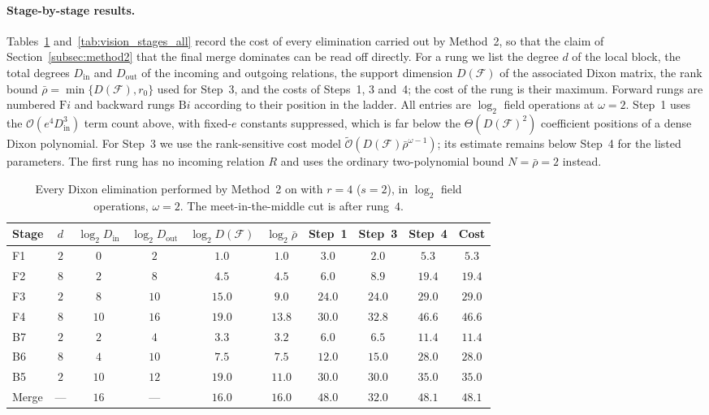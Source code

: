 \paragraph{Stage-by-stage results.}
Tables~\ref{tab:vision_stages_r4} and~\ref{tab:vision_stages_all} record the cost of every elimination carried out by Method~2, so that the claim of Section~\ref{subsec:method2} that the final merge dominates can be read off directly. For a rung we list the degree $d$ of the local block, the total degrees $D_{\mathrm{in}}$ and $D_{\mathrm{out}}$ of the incoming and outgoing relations, the support dimension $D(\mathcal{F})$ of the associated Dixon matrix, the rank bound $\bar\rho=\min\{D(\mathcal F),r_0\}$ used for Step~3, and the costs of Steps~1, 3 and~4; the cost of the rung is their maximum. Forward rungs are numbered $\mathrm{F}i$ and backward rungs $\mathrm{B}i$ according to their position in the ladder. All entries are $\log_2$ field operations at $\omega=2$. Step~1 uses the $\mathcal{O}(e^4D_{\mathrm{in}}^{3})$ term count above, with fixed-$e$ constants suppressed, which is far below the $\Theta(D(\mathcal{F})^2)$ coefficient positions of a dense Dixon polynomial. For Step~3 we use the rank-sensitive cost model $\widetilde{\mathcal{O}}(D(\mathcal{F})\bar\rho^{\omega-1})$; its estimate remains below Step~4 for the listed parameters. The first rung has no incoming relation $R$ and uses the ordinary two-polynomial bound $N=\bar\rho=2$ instead.

\begin{table}[ht]
	\centering
	\small
	\caption{Every Dixon elimination performed by Method~2 on \vision with $r=4$ ($s=2$), in $\log_2$ field operations, $\omega=2$. The meet-in-the-middle cut is after rung~$4$.}
	\label{tab:vision_stages_r4}
	\setlength{\tabcolsep}{4pt}
	\renewcommand{\arraystretch}{1.1}
	\begin{tabular}{lccccccccc}
		\toprule
		Stage & $d$ & $\log_2 D_{\mathrm{in}}$ & $\log_2 D_{\mathrm{out}}$ & $\log_2 D(\mathcal{F})$ & $\log_2\bar\rho$ & Step~1 & Step~3 & Step~4 & Cost \\
		\midrule
		F1    & $2$ & $0$  & $2$  & $1.0$  & $1.0$  & $3.0$  & $2.0$  & $5.3$  & $5.3$ \\
		F2    & $8$ & $2$  & $8$  & $4.5$  & $4.5$  & $6.0$  & $8.9$  & $19.4$ & $19.4$ \\
		F3    & $2$ & $8$  & $10$ & $15.0$ & $9.0$  & $24.0$ & $24.0$ & $29.0$ & $29.0$ \\
		F4    & $8$ & $10$ & $16$ & $19.0$ & $13.8$ & $30.0$ & $32.8$ & $46.6$ & $46.6$ \\
		\midrule
		B7    & $2$ & $2$  & $4$  & $3.3$  & $3.2$  & $6.0$  & $6.5$  & $11.4$ & $11.4$ \\
		B6    & $8$ & $4$  & $10$ & $7.5$  & $7.5$  & $12.0$ & $15.0$ & $28.0$ & $28.0$ \\
		B5    & $2$ & $10$ & $12$ & $19.0$ & $11.0$ & $30.0$ & $30.0$ & $35.0$ & $35.0$ \\
		\midrule
		Merge & --- & $16$ & ---  & $16.0$ & $16.0$ & $48.0$ & $32.0$ & $48.1$ & $\mathbf{48.1}$ \\
		\bottomrule
	\end{tabular}
\end{table}

